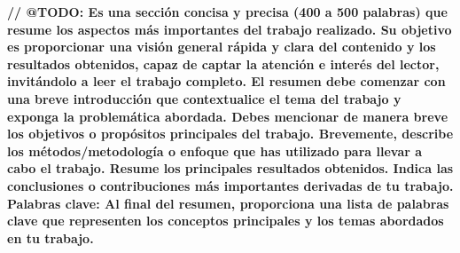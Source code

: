 \begin{resume}
    \textbf{// @TODO: Es una sección concisa y precisa (400 a 500 palabras) que resume los aspectos más importantes del trabajo realizado. Su objetivo es proporcionar una visión general rápida y clara del contenido y los resultados obtenidos, capaz de captar la atención e interés del lector, invitándolo a leer el trabajo completo.
    El resumen debe comenzar con una breve introducción que contextualice el tema del trabajo y exponga la problemática abordada. Debes mencionar de manera breve los objetivos o propósitos principales del trabajo. Brevemente, describe los métodos/metodología o enfoque que has utilizado para llevar a cabo el trabajo. Resume los principales resultados obtenidos. Indica las conclusiones o contribuciones más importantes derivadas de tu trabajo.
    Palabras clave: Al final del resumen, proporciona una lista de palabras clave que representen los conceptos principales y los temas abordados en tu trabajo.
    }

    \vspace{0.5cm}
\end{resume}
